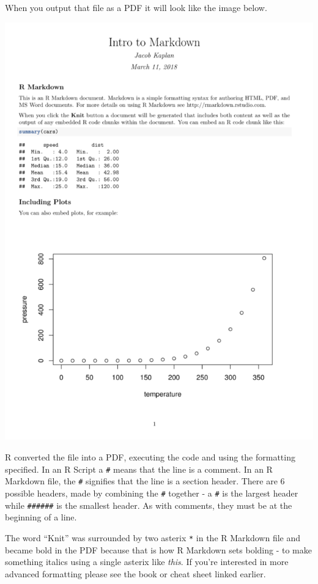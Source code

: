 \documentclass[
  12pt,
]{book}
\begin{document}
When you output that file as a PDF it will look like the image below.

\includegraphics{images/markdown_output_example.PNG}

R converted the file into a PDF, executing the code and using the formatting specified. In an R Script a \texttt{\#} means that the line is a comment. In an R Markdown file, the \texttt{\#} signifies that the line is a section header. There are 6 possible headers, made by combining the \texttt{\#} together - a \texttt{\#} is the largest header while \texttt{\#\#\#\#\#\#} is the smallest header. As with comments, they must be at the beginning of a line.

The word ``Knit'' was surrounded by two asterix \texttt{*} in the R Markdown file and became bold in the PDF because that is how R Markdown sets bolding - to make something italics using a single asterix like \emph{this}. If you're interested in more advanced formatting please see the book or cheat sheet linked earlier.
\end{document}
